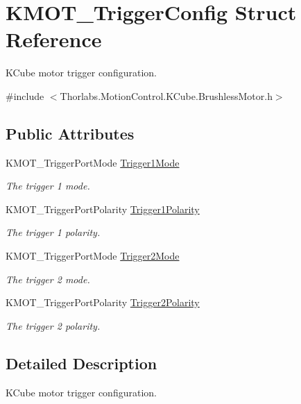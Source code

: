 \hypertarget{struct_k_m_o_t___trigger_config}{}\section{K\+M\+O\+T\+\_\+\+Trigger\+Config Struct Reference}
\label{struct_k_m_o_t___trigger_config}


K\+Cube motor trigger configuration.  




{\ttfamily \#include $<$Thorlabs.\+Motion\+Control.\+K\+Cube.\+Brushless\+Motor.\+h$>$}

\subsection*{Public Attributes}
\begin{DoxyCompactItemize}
\item 
K\+M\+O\+T\+\_\+\+Trigger\+Port\+Mode \hyperlink{struct_k_m_o_t___trigger_config_aa3a6f017783b4ebff5ecacc491a6192f}{Trigger1\+Mode}
\begin{DoxyCompactList}\small\item\em The trigger 1 mode. \end{DoxyCompactList}\item 
K\+M\+O\+T\+\_\+\+Trigger\+Port\+Polarity \hyperlink{struct_k_m_o_t___trigger_config_a64783723d4b264a0ef10c6f9c22b9638}{Trigger1\+Polarity}
\begin{DoxyCompactList}\small\item\em The trigger 1 polarity. \end{DoxyCompactList}\item 
K\+M\+O\+T\+\_\+\+Trigger\+Port\+Mode \hyperlink{struct_k_m_o_t___trigger_config_a7fc46444eb8022abb6cc9c5eb0be8566}{Trigger2\+Mode}
\begin{DoxyCompactList}\small\item\em The trigger 2 mode. \end{DoxyCompactList}\item 
K\+M\+O\+T\+\_\+\+Trigger\+Port\+Polarity \hyperlink{struct_k_m_o_t___trigger_config_a2ad8fdca0dba83c72ccab7fbc5945391}{Trigger2\+Polarity}
\begin{DoxyCompactList}\small\item\em The trigger 2 polarity. \end{DoxyCompactList}\end{DoxyCompactItemize}


\subsection{Detailed Description}
K\+Cube motor trigger configuration. 



